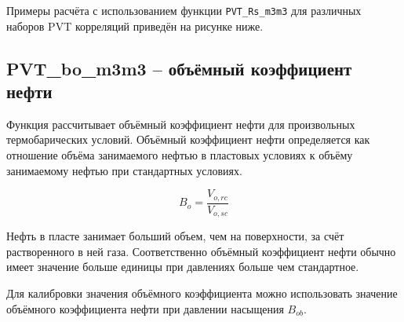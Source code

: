 
Примеры расчёта с использованием функции \texttt{PVT_Rs_m3m3} для различных наборов PVT корреляций приведён на рисунке ниже.

\newcommand{\RsDataFile}{data/Rs_P_data.txt}


\subsection{PVT\_bo\_m3m3 – объёмный коэффициент нефти}

Функция рассчитывает объёмный коэффициент нефти для произвольных термобарических условий. 
Объёмный коэффициент нефти определяется как отношение объёма занимаемого нефтью в пластовых условиях к объёму занимаемому нефтью при стандартных условиях. 

$$B_o = \frac{V_{o,rc}}{V_{o,sc}}$$

Нефть в пласте занимает больший объем, чем на поверхности, за счёт растворенного в ней газа. Соответственно объёмный коэффициент нефти обычно имеет значение больше единицы при давлениях больше чем стандартное.

Для калибровки значения объёмного коэффициента можно использовать значение объёмного коэффициента нефти при давлении насыщения $B_{ob}$. 


